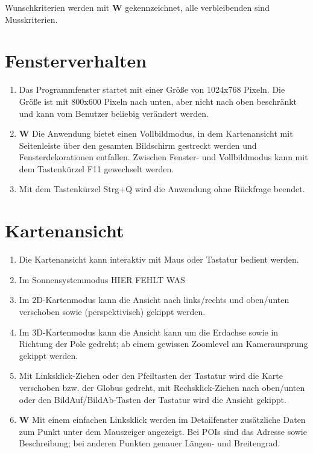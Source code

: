 \documentclass[10pt]{scrreprt}
\begin{document}
\newcommand{\W}{\textbf{W }}
Wunschkriterien werden mit \W  gekennzeichnet, alle verbleibenden sind Musskriterien.

\section{Fensterverhalten}
\begin{enumerate}[leftmargin=2cm]
\item Das Programmfenster startet mit einer Größe von 1024x768 Pixeln. Die Größe ist mit 800x600 Pixeln nach unten, aber nicht nach oben beschränkt und kann vom Benutzer beliebig  verändert werden.
\item \W Die Anwendung bietet einen Vollbildmodus, in dem Kartenansicht mit Seitenleiste über den gesamten Bildschirm gestreckt werden und Fensterdekorationen entfallen. Zwischen Fenster- und Vollbildmodus kann mit dem Tastenkürzel F11 gewechselt werden.
\item Mit dem Tastenkürzel Strg+Q wird die Anwendung ohne Rückfrage beendet.
\end{enumerate}
\section{Kartenansicht}
\begin{enumerate}[leftmargin=2cm,resume]
\item Die Kartenansicht kann interaktiv mit Maus oder Tastatur bedient werden.
\item Im Sonnensystemmodus HIER FEHLT WAS
\item Im 2D-Kartenmodus kann die Ansicht nach links/rechts und oben/unten verschoben sowie (perspektivisch) gekippt werden. 
\item Im 3D-Kartenmodus kann die Ansicht kann um die Erdachse sowie in Richtung der Pole gedreht; ab einem gewissen Zoomlevel am Kameraursprung gekippt werden.
\item Mit Linksklick-Ziehen oder den Pfeiltasten der Tastatur wird die Karte verschoben bzw. der Globus gedreht, mit Rechsklick-Ziehen nach oben/unten oder den BildAuf/BildAb-Tasten der Tastatur wird die Ansicht gekippt.
\item \W Mit einem einfachen Linksklick werden im Detailfenster zusätzliche Daten zum Punkt unter dem Mauszeiger angezeigt. Bei POIs sind das Adresse sowie Beschreibung; bei anderen Punkten genauer Längen- und Breitengrad.
\end{enumerate}
\end{document}
